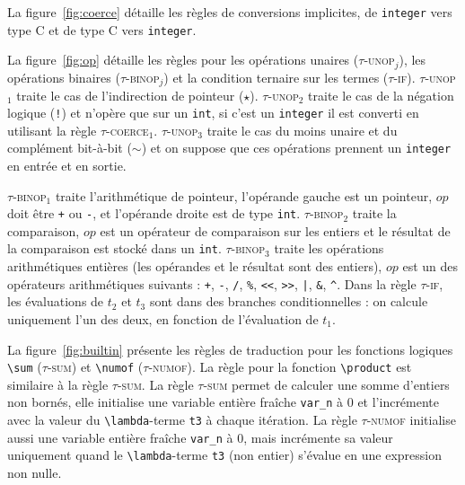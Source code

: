 La figure~\ref{fig:coerce} détaille les règles de conversions implicites, de
\lstinline'integer' vers type C et de type C vers \lstinline'integer'.

La figure~\ref{fig:op} détaille les règles pour les opérations unaires
(\textsc{$\tau$-unop$_{j}$}), les opérations binaires
(\textsc{$\tau$-binop$_{j}$}) et la condition ternaire sur les termes
(\textsc{$\tau$-if}).
\textsc{$\tau$-unop$_1$} traite le cas de l'indirection de pointeur ($\star$).
\textsc{$\tau$-unop$_2$} traite le cas de la négation logique (\lstinline|!|) et
n'opère que sur un \lstinline'int', si c'est un \lstinline'integer' il est
converti en utilisant la règle \textsc{$\tau$-coerce$_1$}.
\textsc{$\tau$-unop$_3$} traite le cas du moins unaire et du complément
bit-à-bit ($\sim$) et on suppose que ces opérations prennent un
\lstinline'integer' en entrée et en sortie.

\textsc{$\tau$-binop$_1$} traite l'arithmétique de pointeur, l'opérande gauche
est un pointeur, $op$ doit être \lstinline|+| ou \lstinline|-|, et l'opérande
droite est de type \lstinline'int'.
\textsc{$\tau$-binop$_2$} traite la comparaison, $op$ est un opérateur de
comparaison sur les entiers et le résultat de la comparaison est stocké dans un
\lstinline|int|.
\textsc{$\tau$-binop$_3$} traite les opérations arithmétiques entières (les
opérandes et le résultat sont des entiers), $op$ est un des opérateurs
arithmétiques suivants : \lstinline|+|, \lstinline|-|, \lstinline|/|,
\lstinline|%|, \lstinline|<<|, \lstinline|>>|, \lstinline{|}, \lstinline|&|,
\lstinline|^|.
Dans la règle \textsc{$\tau$-if}, les évaluations de $t_2$ et $t_3$ sont dans
des branches conditionnelles : on calcule uniquement l'un des deux, en fonction
de l'évaluation de $t_1$.

La figure~\ref{fig:builtin} présente les règles de traduction pour les fonctions
logiques \lstinline|\sum| (\textsc{$\tau$-sum}) et \lstinline|\numof|
(\textsc{$\tau$-numof}).
La règle pour la fonction \lstinline|\product| est similaire à la règle
\textsc{$\tau$-sum}.
La règle \textsc{$\tau$-sum} permet de calculer une somme d'entiers non bornés,
elle initialise une variable entière fraîche \lstinline|var_n| à $0$ et
l'incrémente avec la valeur du \lstinline|\lambda|-terme \lstinline't3' à chaque
itération.
La règle \textsc{$\tau$-numof} initialise aussi une variable entière fraîche
\lstinline|var_n| à $0$, mais incrémente sa valeur uniquement quand le
\lstinline|\lambda|-terme \lstinline't3' (non entier) s'évalue en une expression
non nulle.


